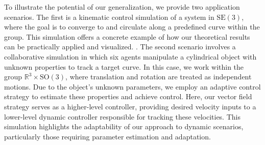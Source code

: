 To illustrate the potential of our generalization, we provide two application scenarios. The first is a kinematic control simulation of a system in $\text{SE}(3)$, where the goal is to converge to and circulate along a predefined curve within the group. This simulation offers a concrete example of how our theoretical results can be practically applied and visualized. . The second scenario involves a collaborative simulation in which six agents manipulate a cylindrical object with unknown properties to track a target curve. In this case, we work within the group $\mathbb{R}^3\times\text{SO}(3)$, where translation and rotation are treated as independent motions. Due to the object's unknown parameters, we employ an adaptive control strategy to estimate these properties and achieve control. Here, our vector field strategy serves as a higher-level controller, providing desired velocity inputs to a lower-level dynamic controller responsible for tracking these velocities. This simulation highlights the adaptability of our approach to dynamic scenarios, particularly those requiring parameter estimation and adaptation.



